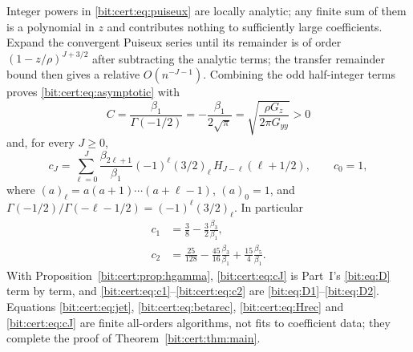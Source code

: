 \documentclass[11pt]{article}
\theoremstyle{definition}\newtheorem{definition}[theorem]{Definition}
\theoremstyle{remark}\newtheorem{remark}[theorem]{Remark}
\begin{document}
Integer powers in \eqref{bit:cert:eq:puiseux} are locally analytic; any finite
sum of them is a polynomial in $z$ and contributes nothing to sufficiently
large coefficients. Expand the convergent Puiseux series until its remainder
is of order $(1-z/\rho)^{J+3/2}$ after subtracting the analytic terms; the
transfer remainder bound then gives a relative $O(n^{-J-1})$. Combining the
odd half-integer terms proves \eqref{bit:cert:eq:asymptotic} with
\begin{equation}\label{bit:cert:eq:C}
 C=\frac{\beta_1}{\Gamma(-1/2)}
   =-\frac{\beta_1}{2\sqrt\pi}
   =\sqrt{\frac{\rho G_z}{2\pi G_{yy}}}>0
\end{equation}
and, for every $J\ge0$,
\begin{equation}\label{bit:cert:eq:cJ}
 c_J=\sum_{\ell=0}^J\frac{\beta_{2\ell+1}}{\beta_1}
             (-1)^\ell(3/2)_\ell\,
             H_{J-\ell}(\ell+1/2),\qquad c_0=1,
\end{equation}
where $(a)_\ell=a(a+1)\cdots(a+\ell-1)$, $(a)_0=1$, and
$\Gamma(-1/2)/\Gamma(-\ell-1/2)=(-1)^\ell(3/2)_\ell$. In particular
\begin{align}
 c_1&=\frac38-\frac32\frac{\beta_3}{\beta_1},\label{bit:cert:eq:c1}\\
 c_2&=\frac{25}{128}-\frac{45}{16}\frac{\beta_3}{\beta_1}
                       +\frac{15}{4}\frac{\beta_5}{\beta_1}.\label{bit:cert:eq:c2}
\end{align}
With Proposition~\ref{bit:cert:prop:hgamma}, \eqref{bit:cert:eq:cJ} is
Part~I's \eqref{bit:eq:D} term by term, and
\eqref{bit:cert:eq:c1}--\eqref{bit:cert:eq:c2} are \eqref{bit:eq:D1}--\eqref{bit:eq:D2}.
Equations \eqref{bit:cert:eq:jet}, \eqref{bit:cert:eq:betarec},
\eqref{bit:cert:eq:Hrec} and \eqref{bit:cert:eq:cJ} are finite all-orders
algorithms, not fits to coefficient data; they complete the proof of
Theorem~\ref{bit:cert:thm:main}.
\end{document}
